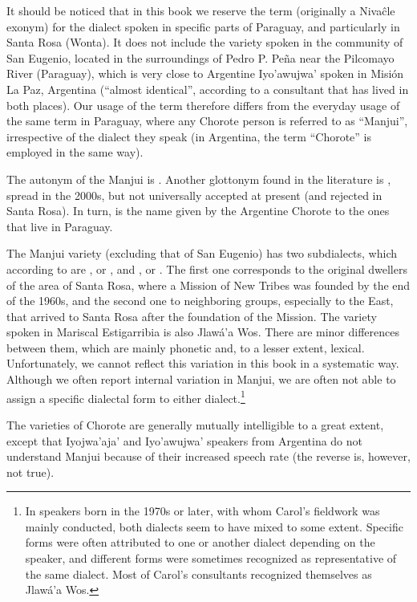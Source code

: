It should be noticed that in this book we reserve the term  (originally a Nivaĉle exonym) for the dialect spoken in specific parts of Paraguay, and particularly in Santa Rosa (Wonta). It does not include the variety spoken in the community of San Eugenio, located in the surroundings of Pedro P. Peña near the Pilcomayo River (Paraguay), which is very close to Argentine Iyo'awujwa' spoken in Misión La Paz, Argentina (``almost identical'', according to a consultant that has lived in both places). Our usage of the term  therefore differs from the everyday usage of the same term in Paraguay, where any Chorote person is referred to as ``Manjui'', irrespective of the dialect they speak (in Argentina, the term ``Chorote'' is employed in the same way).

The autonym of the Manjui is . Another glottonym found in the literature is , spread in the 2000s, but not universally accepted at present (and rejected in Santa Rosa). In turn,  is the name given by the Argentine Chorote to the ones that live in Paraguay.

The Manjui variety (excluding that of San Eugenio) has two subdialects, which according to \citet{GH94} are , or , and , or . The first one corresponds to the original dwellers of the area of Santa Rosa, where a Mission of New Tribes was founded by the end of the 1960s, and the second one to neighboring groups, especially to the East, that arrived to Santa Rosa after the foundation of the Mission. The variety spoken in Mariscal Estigarribia is also Jlawá'a Wos. There are minor differences between them, which are mainly phonetic and, to a lesser extent, lexical. Unfortunately, we cannot reflect this variation in this book in a systematic way. Although we often report internal variation in Manjui, we are often not able to assign a specific dialectal form to either dialect.\footnote{In speakers born in the 1970s or later, with whom Carol's fieldwork was mainly conducted, both dialects seem to have mixed to some extent. Specific forms were often attributed to one or another dialect depending on the speaker, and different forms were sometimes recognized as representative of the same dialect. Most of Carol's consultants recognized themselves as Jlawá'a Wos.}

The varieties of Chorote are generally mutually intelligible to a great extent, except that Iyojwa'aja' and Iyo'awujwa' speakers from Argentina do not understand Manjui because of their increased speech rate (the reverse is, however, not true).

